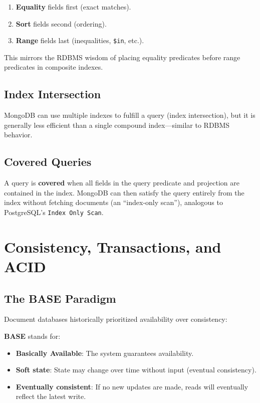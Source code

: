 \documentclass[12pt,a4paper]{article}
\begin{document}
\begin{enumerate}[noitemsep]
    \item \textbf{Equality} fields first (exact matches).
    \item \textbf{Sort} fields second (ordering).
    \item \textbf{Range} fields last (inequalities, \texttt{\$in}, etc.).
\end{enumerate}

This mirrors the RDBMS wisdom of placing equality predicates before range predicates in composite indexes.

\subsection{Index Intersection}

MongoDB can use multiple indexes to fulfill a query (index intersection), but it is generally less efficient than a single compound index---similar to RDBMS behavior.

\subsection{Covered Queries}

A query is \textbf{covered} when all fields in the query predicate and projection are contained in the index. MongoDB can then satisfy the query entirely from the index without fetching documents (an ``index-only scan''), analogous to PostgreSQL's \texttt{Index Only Scan}.

\section{Consistency, Transactions, and ACID}

\subsection{The BASE Paradigm}

Document databases historically prioritized availability over consistency:

\begin{definition}
\textbf{BASE} stands for:
\begin{itemize}[noitemsep]
    \item \textbf{Basically Available}: The system guarantees availability.
    \item \textbf{Soft state}: State may change over time without input (eventual consistency).
    \item \textbf{Eventually consistent}: If no new updates are made, reads will eventually reflect the latest write.
\end{itemize}
\end{definition}
\end{document}
